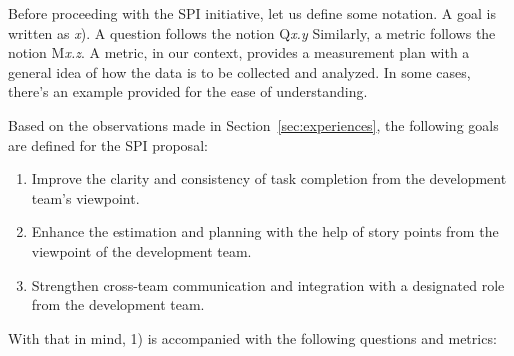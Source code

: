 \documentclass[conference]{IEEEtran}
\begin{document}
Before proceeding with the SPI initiative, let us define some notation. A goal
is written as \textit{x}). A question follows the notion Q\textit{x.y}
Similarly, a metric follows the notion M\textit{x.z}. A metric, in our context,
provides a measurement plan with a general idea of how the data is to be
collected and analyzed. In some cases, there's an example provided for the ease
of understanding.

Based on the observations made in Section~\ref{sec:experiences}, the following
goals are defined for the SPI proposal:

\begin{enumerate}
  \item Improve the clarity and consistency of task completion from the
    development team’s viewpoint.
  \item Enhance the estimation and planning with the help of story points
    from the viewpoint of the development team. 
  \item Strengthen cross-team communication and integration with a
    designated role from the development team. 
\end{enumerate}

With that in mind, 1) is accompanied with the following questions and metrics:
\end{document}
